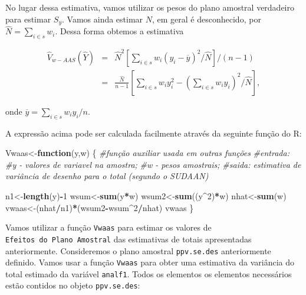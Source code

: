 \documentclass[]{book}
\newenvironment{Shaded}{\begin{snugshade}}{\end{snugshade}}
\newcommand{\KeywordTok}[1]{\textcolor[rgb]{0.13,0.29,0.53}{\textbf{#1}}}
\newcommand{\DecValTok}[1]{\textcolor[rgb]{0.00,0.00,0.81}{#1}}
\newcommand{\StringTok}[1]{\textcolor[rgb]{0.31,0.60,0.02}{#1}}
\newcommand{\CommentTok}[1]{\textcolor[rgb]{0.56,0.35,0.01}{\textit{#1}}}
\newcommand{\ControlFlowTok}[1]{\textcolor[rgb]{0.13,0.29,0.53}{\textbf{#1}}}
\newcommand{\OperatorTok}[1]{\textcolor[rgb]{0.81,0.36,0.00}{\textbf{#1}}}
\newcommand{\NormalTok}[1]{#1}
\theoremstyle{definition}
\theoremstyle{definition}
\theoremstyle{definition}
\theoremstyle{remark}
\begin{document}
No lugar dessa estimativa, vamos utilizar os pesos do plano amostral
verdadeiro para estimar \(S_y\). Vamos ainda estimar \(N\), em geral é
desconhecido, por \(\widehat{N}=\sum_{i \in s} w_i\). Dessa forma
obtemos a estimativa

\begin{eqnarray*}
\widehat{V}_{w-AAS}\left(\widehat{Y}\right)&=& \widehat{N}^2\left[\sum_{i \in s}w_i\left(y_i-\overline{y}\right)^2/\widehat{N}\right]/(n-1)\\
&=&\frac{\widehat{N}}{n-1}\left[\sum_{i \in s}w_iy_i^2-\left(\sum_{i \in s}w_iy_i\right)^2/\widehat{N}\right],
\end{eqnarray*}

onde \(\overline{y}=\sum_{i \in s}w_iy_i/n\).

A expressão acima pode ser calculada facilmente através da seguinte
função do R:

\begin{Shaded}
\begin{Highlighting}[]
\NormalTok{Vwaas<-}\ControlFlowTok{function}\NormalTok{(y,w)}
\NormalTok{\{}
\CommentTok{#função auxiliar usada em outras funções}
\CommentTok{#entrada:}
\CommentTok{#y - valores de variavel na amostra;}
\CommentTok{#w - pesos amostrais;}
\CommentTok{#saida:  estimativa de variância de desenho para o total (segundo o SUDAAN)}

\NormalTok{n1<-}\KeywordTok{length}\NormalTok{(y)}\OperatorTok{-}\DecValTok{1}
\NormalTok{wsum<-}\KeywordTok{sum}\NormalTok{(y}\OperatorTok{*}\NormalTok{w)}
\NormalTok{wsum2<-}\KeywordTok{sum}\NormalTok{((y}\OperatorTok{^}\DecValTok{2}\NormalTok{)}\OperatorTok{*}\NormalTok{w)}
\NormalTok{nhat<-}\KeywordTok{sum}\NormalTok{(w)}
\NormalTok{vwaas<-(nhat}\OperatorTok{/}\NormalTok{n1)}\OperatorTok{*}\NormalTok{(wsum2}\OperatorTok{-}\NormalTok{wsum}\OperatorTok{^}\DecValTok{2}\OperatorTok{/}\NormalTok{nhat)}
\NormalTok{vwaas}
\NormalTok{\}}
\end{Highlighting}
\end{Shaded}

Vamos utilizar a função \texttt{Vwaas} para estimar os valores de
\texttt{Efeitos\ do\ Plano\ Amostral} das estimativas de totais
apresentadas anteriormente. Consideremos o plano amostral
\texttt{ppv.se.des} anteriormente definido. Vamos usar a função
\texttt{Vwaas} para obter uma estimativa da variância do total estimado
da variável \texttt{analf1}. Todos os elementos os elementos necessários
estão contidos no objeto \texttt{ppv.se.des}:

\begin{Shaded}
\end{Shaded}
\end{document}
